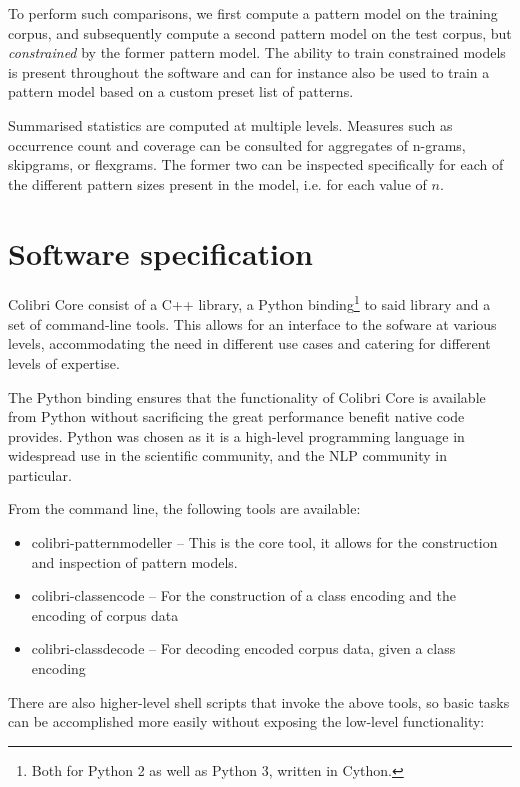 To perform such comparisons, we first compute a pattern model on the training
corpus, and subsequently compute a second pattern model on the test corpus, but
\emph{constrained} by the former pattern model. The ability to train
constrained models is present throughout the software and can for instance also
be used to train a pattern model based on a custom preset list of patterns.

Summarised statistics are computed at multiple levels. Measures such as
occurrence count and coverage can be consulted for aggregates of n-grams,
skipgrams, or flexgrams. The former two can be inspected specifically for each
of the different pattern sizes present in the model, i.e. for each value of $n$.


\section{Software specification}

Colibri Core consist of a C++ library, a Python binding\footnote{Both for
Python 2 as well as Python 3, written in Cython.} to said library and a set of
command-line tools. This allows for an interface to the sofware at various
levels, accommodating the need in different use cases and catering for
different levels of expertise. 

The Python binding ensures that the functionality of Colibri Core is available
from Python without sacrificing the great performance benefit native code
provides. Python was chosen as it is a high-level programming language in
widespread use in the scientific community, and the NLP community in
particular.

From the command line, the following tools are available:

\begin{itemize}
    \item colibri-patternmodeller -- This is the core tool, it allows for the
        construction and inspection of pattern models.
    \item colibri-classencode -- For the construction of a class encoding and
        the encoding of corpus data
    \item colibri-classdecode -- For decoding encoded corpus data, given a class
        encoding
\end{itemize}

There are also higher-level shell scripts that invoke the above tools, so basic
tasks can be accomplished more easily without exposing the low-level functionality:

